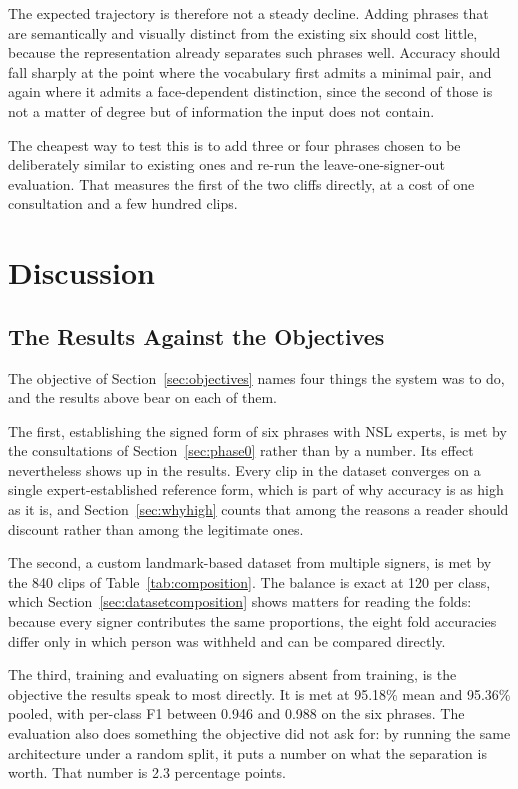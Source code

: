 \noindent The expected trajectory is therefore not a steady decline. Adding phrases that are
semantically and visually distinct from the existing six should cost little, because the
representation already separates such phrases well. Accuracy should fall sharply at the
point where the vocabulary first admits a minimal pair, and again where it admits a
face-dependent distinction, since the second of those is not a matter of degree but of
information the input does not contain.

The cheapest way to test this is to add three or four phrases chosen to be deliberately
similar to existing ones and re-run the leave-one-signer-out evaluation. That measures the
first of the two cliffs directly, at a cost of one consultation and a few hundred clips.

\section{Discussion}
\label{sec:discussion}

\subsection{The Results Against the Objectives}

The objective of Section~\ref{sec:objectives} names four things the system was to do, and the results above bear on each of them.

The first, establishing the signed form of six phrases with NSL experts, is met by the consultations of Section~\ref{sec:phase0} rather than by a number. Its effect nevertheless shows up in the results. Every clip in the dataset converges on a single expert-established reference form, which is part of why accuracy is as high as it is, and Section~\ref{sec:whyhigh} counts that among the reasons a reader should discount rather than among the legitimate ones.

The second, a custom landmark-based dataset from multiple signers, is met by the 840 clips of Table~\ref{tab:composition}. The balance is exact at 120 per class, which Section~\ref{sec:datasetcomposition} shows matters for reading the folds: because every signer contributes the same proportions, the eight fold accuracies differ only in which person was withheld and can be compared directly.

The third, training and evaluating on signers absent from training, is the objective the results speak to most directly. It is met at 95.18\% mean and 95.36\% pooled, with per-class F1 between 0.946 and 0.988 on the six phrases. The evaluation also does something the objective did not ask for: by running the same architecture under a random split, it puts a number on what the separation is worth. That number is 2.3 percentage points.

